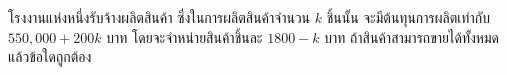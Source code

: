 ﻿%
\question โรงงานแห่งหนึ่งรับจ้างผลิตสินค้า ซึ่งในการผลิตสินค้าจำนวน $k$ ชิ้นนั้น จะมีต้นทุนการผลิตเท่ากับ $550,000+200k$ บาท โดยจะจำหน่ายสินค้าชิ้นละ $1800-k$ บาท ถ้าสินค้าสามารถขายได้ทั้งหมด แล้วข้อใดถูกต้อง
\newline
{}
